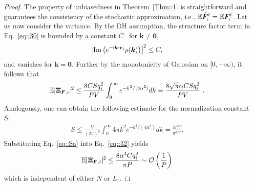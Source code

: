 \begin{proof}%
    The property of unbiasedness in Theorem~\ref{Thm::1} is straightforward and guarantees the consistency of the stochastic approximation, i.e., $\mathbb{E}\boldsymbol{ \tilde{F}}_i^{\ell}=\mathbb{E}\boldsymbol{F}_i^{\ell}$. 
    Let us now consider the variance.
    By the DH assumption, the structure factor term in Eq.~\eqref{eq::30} is bounded by a constant $C$~\cite{jin2021random} for $\bm{k}\neq \bm{0}$,
    \begin{equation}
        \left|\text{Im}\left(e^{-\mathsf i \boldsymbol{k}\cdot \boldsymbol{r}_i}\rho(\boldsymbol{k})\right)\right|^2\leq C,
    \end{equation}
    and vanishes for $\bm{k}=\bm{0}$. 
    Further by the monotonicity of Gaussian on $[0, +\infty )$, it follows that
    \begin{equation}\label{eq::32}
        \begin{split}
            \mathbb{E}|\V \Xi_{\V F,i}|^2\leq \frac{8 CSq_i^2}{PV}\int_{0}^{\infty}e^{-k^2/(4\alpha^2)}dk= \frac{8\sqrt{\pi}\alpha CSq_i^2}{PV}\;.%
        \end{split}
    \end{equation}
    Analogously, one can obtain the following estimate for the normalization constant $S$:
    \begin{equation}\label{eq::Sa}
        \begin{split}
            S\leq \frac{V}{(2\pi)^3}\int_{0}^{\infty}4\pi k^2e^{-k^2/(4\alpha^2)}dk=\frac{\alpha^3V}{\pi^{3/2}}.
        \end{split}
    \end{equation}
    Substituting Eq.~\eqref{eq::Sa} into Eq.~\eqref{eq::32} yields
    \begin{equation}
        \mathbb{E}|\boldsymbol{\Xi}_{\boldsymbol{F},i}|^2\leq\frac{8\alpha^4Cq_i^2}{\pi P}\sim \mathcal O\left(\frac{1}{P}\right)
    \end{equation}
    which is independent of either $N$ or $L_z$.
\end{proof}

